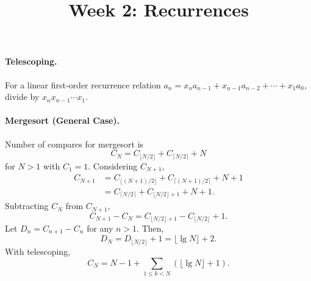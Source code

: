\documentclass{article}
\begin{document}
\title{Week 2: Recurrences}
\maketitle

\paragraph{Telescoping.} For a linear first-order recurrence relation $a_n =
x_na_{n - 1} + x_{n - 1}a_{n - 2} + \cdots + x_1a_0$, divide by $x_nx_{n - 1}
\cdots{}x_1$.

\paragraph{Mergesort (General Case).} Number of compares for mergesort is
\begin{equation*}
  C_N = C_{\lfloor N/2 \rfloor} + C_{\lceil N/2 \rceil} + N
\end{equation*} for $N > 1$ with $C_1 = 1$. Considering $C_{N + 1}$,
\begin{align*}
  C_{N + 1} &= C_{\lfloor (N+1)/2 \rfloor} + C_{\lceil (N+1)/2 \rceil} + N + 1
    \\
    &= C_{\lceil N/2 \rceil} + C_{\lfloor N/2 \rfloor + 1} + N + 1.
\end{align*} Subtracting $C_N$ from $C_{N + 1}$, \begin{equation*}
  C_{N + 1} - C_N = C_{\lfloor N/2 \rfloor + 1} - C_{\lfloor N/2 \rfloor} + 1.
\end{equation*} Let $D_n = C_{n + 1} - C_n$ for any $n > 1$. Then,
\begin{equation*}
  D_N = D_{\lfloor N/2 \rfloor} + 1 = \lfloor \lg{N} \rfloor + 2.
\end{equation*} With telescoping, \begin{equation*}
  C_N = N - 1 + \sum_{1 \leq k < N}(\lfloor \lg{N} \rfloor + 1).
\end{equation*}
\end{document}
